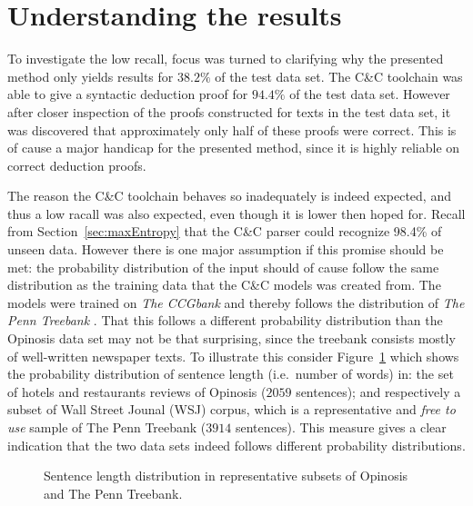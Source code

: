 \section{Understanding the results}
To investigate the low recall, focus was turned to clarifying why the presented method only yields results for $38.2\%$ of the test data set. The C\&C toolchain was able to give a syntactic deduction proof for $94.4\%$ of the test data set. However after closer inspection of the proofs constructed for texts in the test data set, it was discovered that approximately only half of these proofs were correct. This is of cause a major handicap for the presented method, since it is highly reliable on correct deduction proofs. 

The reason the C\&C toolchain behaves so inadequately is indeed expected, and thus a low racall was also expected, even though it is lower then hoped for. Recall from Section~\ref{sec:maxEntropy} that the C\&C parser could recognize 98.4\% of unseen data. However there is one major assumption if this promise should be met: the probability distribution of the input should of cause follow the same distribution as the training data that the C\&C models was created from. The models were trained on \emph{The CCGbank} \cite{ccgBank} and thereby follows the distribution of \emph{The Penn Treebank} \cite{pennTreebank}. That this follows a different probability distribution than the Opinosis data set may not be that surprising, since the treebank consists mostly of well-written newspaper texts. To illustrate this consider Figure~\ref{fig:distBias} which shows the probability distribution of sentence length (i.e.\ number of words) in: the set of hotels and restaurants reviews of Opinosis ($\num{2059}$ sentences); and respectively a subset of Wall Street Jounal (WSJ) corpus, which is a representative and \emph{free to use} sample of The Penn Treebank ($\num{3914}$ sentences). This measure gives a clear indication that the two data sets indeed follows different probability distributions.
\begin{figure}[ht]
\begin{center}
\end{center}
\vspace{-1em}
\caption{Sentence length distribution in representative subsets of Opinosis and The Penn Treebank.}
\label{fig:distBias}
\end{figure}

